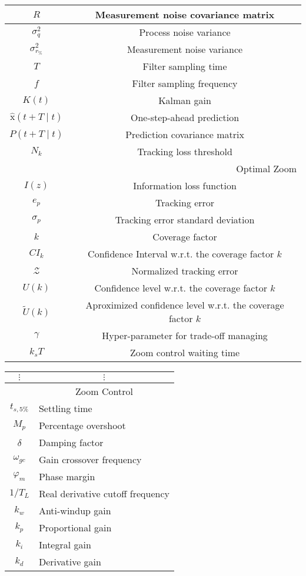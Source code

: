 \documentclass[conference]{IEEEtran}
\begin{document}
\begin{center}
\begin{tabular}{|c|c|}
\hline
$R$ & Measurement noise covariance matrix \\
\hline
$\sigma_{q}^{2}$ & Process noise variance \\
\hline
$\sigma_{r_{\%}}^{2}$ & Measurement noise variance \\
\hline
$T$ & Filter sampling time \\
\hline
$f$ & Filter sampling frequency \\
\hline
$K(t)$ & Kalman gain \\
\hline
$\hat{\mathrm{x}}(t+T \mid t)$ & One-step-ahead prediction \\
\hline
$P(t+T \mid t)$ & Prediction covariance matrix \\
\hline
$N_{k}$ & Tracking loss threshold \\
\hline
\multicolumn{2}{|r|}{Optimal Zoom} \\
\hline
$I(z)$ & Information loss function \\
\hline
$e_{p}$ & Tracking error \\
\hline
$\sigma_{p}$ & Tracking error standard deviation \\
\hline
$k$ & Coverage factor \\
\hline
$C I_{k}$ & Confidence Interval w.r.t. the coverage factor $k$ \\
\hline
$\mathcal{Z}$ & Normalized tracking error \\
\hline
$U(k)$ & Confidence level w.r.t. the coverage factor $k$ \\
\hline
$\tilde{U}(k)$ & Aproximized confidence level w.r.t. the coverage factor $k$ \\
\hline
$\gamma$ & Hyper-parameter for trade-off managing \\
\hline
$k_{s} T$ & Zoom control waiting time \\
\hline
\end{tabular}
\end{center}

\begin{center}
\begin{tabular}{cl}
$\vdots$ & \multicolumn{1}{c}{$\vdots$} \\
\hline
 & \multicolumn{1}{c}{Zoom Control} \\
\hline
$t_{s, 5 \%}$ & Settling time \\
$M_{p}$ & Percentage overshoot \\
$\delta$ & Damping factor \\
$\omega_{g c}$ & Gain crossover frequency \\
$\varphi_{m}$ & Phase margin \\
$1 / T_{L}$ & Real derivative cutoff frequency \\
$k_{w}$ & Anti-windup gain \\
$k_{p}$ & Proportional gain \\
$k_{i}$ & Integral gain \\
$k_{d}$ & Derivative gain \\
\end{tabular}
\end{center}
\end{document}
